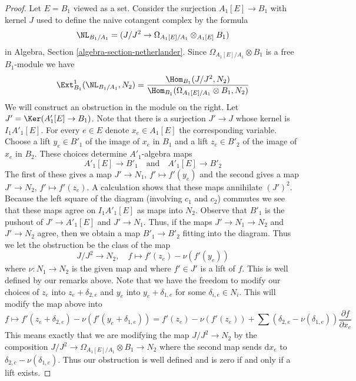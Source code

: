 \begin{proof}
Let $E = B_1$ viewed as a set.
Consider the surjection $A_1[E] \to B_1$ with kernel $J$ used
to define the naive cotangent complex by the formula
$$
\NL_{B_1/A_1} = (J/J^2 \to \Omega_{A_1[E]/A_1} \otimes_{A_1[E]} B_1)
$$
in
Algebra, Section \ref{algebra-section-netherlander}.
Since $\Omega_{A_1[E]/A_1} \otimes B_1$ is a free
$B_1$-module we have
$$
\Ext^1_{B_1}(\NL_{B_1/A_1}, N_2) =
\frac{\Hom_{B_1}(J/J^2, N_2)}
{\Hom_{B_1}(\Omega_{A_1[E]/A_1} \otimes B_1, N_2)}
$$
We will construct an obstruction in the module on the right.
Let $J' = \Ker(A'_1[E] \to B_1)$. Note that there is a surjection
$J' \to J$ whose kernel is $I_1A'_1[E]$.
For every $e \in E$ denote $x_e \in A_1[E]$ the corresponding variable.
Choose a lift $y_e \in B'_1$ of the image of $x_e$ in $B_1$ and
a lift $z_e \in B'_2$ of the image of $x_e$ in $B_2$.
These choices determine $A'_1$-algebra maps
$$
A'_1[E] \to B'_1 \quad\text{and}\quad A'_1[E] \to B'_2
$$
The first of these gives a map $J' \to N_1$, $f' \mapsto f'(y_e)$
and the second gives a map $J' \to N_2$, $f' \mapsto f'(z_e)$.
A calculation shows that these maps annihilate $(J')^2$.
Because the left square of the diagram (involving $c_1$ and $c_2$)
commutes we see that these maps agree on $I_1A'_1[E]$ as maps into $N_2$.
Observe that $B'_1$ is the pushout of $J' \to A'_1[E]$ and $J' \to N_1$. 
Thus, if the maps $J' \to N_1 \to N_2$ and $J' \to N_2$ agree, then we
obtain a map $B'_1 \to B'_2$ fitting into the diagram.
Thus we let the obstruction be the class of the map
$$
J/J^2 \to N_2,\quad f \mapsto f'(z_e) - \nu(f'(y_e))
$$
where $\nu : N_1 \to N_2$ is the given map and where $f' \in J'$
is a lift of $f$. This is well defined by our remarks above.
Note that we have the freedom
to modify our choices of $z_e$ into $z_e + \delta_{2, e}$
and $y_e$ into $y_e + \delta_{1, e}$ for some $\delta_{i, e} \in N_i$.
This will modify the map above into
$$
f \mapsto f'(z_e + \delta_{2, e}) - \nu(f'(y_e + \delta_{1, e})) =
f'(z_e) - \nu(f'(z_e)) +
\sum (\delta_{2, e} - \nu(\delta_{1, e}))\frac{\partial f}{\partial x_e}
$$
This means exactly that we are modifying the map $J/J^2 \to N_2$
by the composition $J/J^2 \to \Omega_{A_1[E]/A_1} \otimes B_1 \to N_2$
where the second map sends $\text{d}x_e$ to
$\delta_{2, e} - \nu(\delta_{1, e})$. Thus our obstruction is well defined
and is zero if and only if a lift exists.


\end{proof}
